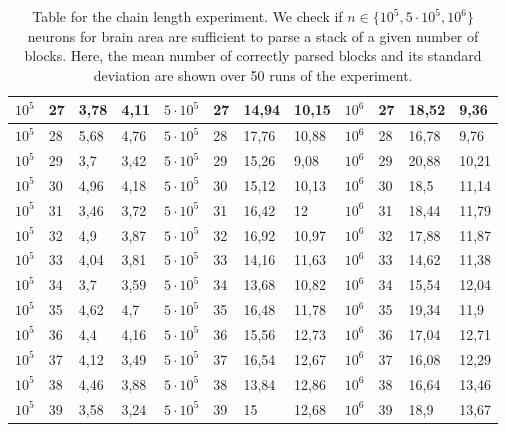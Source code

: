 \documentclass[letterpaper]{article}
\begin{document}
\begin{table}[t]
\begin{tabular}{||l|l|l|l||l|l|l|l||l|l|l|l||}
$10^5$ & 27            & 3,78 & 4,11 & $5 \cdot 10^5$ & 27            & 14,94 & 10,15 & $10^6$ & 27            & 18,52 & 9,36  \\ \hline
$10^5$ & 28            & 5,68 & 4,76 & $5 \cdot 10^5$ & 28            & 17,76 & 10,88 & $10^6$ & 28            & 16,78 & 9,76  \\ \hline
$10^5$ & 29            & 3,7  & 3,42 & $5 \cdot 10^5$ & 29            & 15,26 & 9,08  & $10^6$ & 29            & 20,88 & 10,21 \\ \hline
$10^5$ & 30            & 4,96 & 4,18 & $5 \cdot 10^5$ & 30            & 15,12 & 10,13 & $10^6$ & 30            & 18,5  & 11,14 \\ \hline
$10^5$ & 31            & 3,46 & 3,72 & $5 \cdot 10^5$ & 31            & 16,42 & 12    & $10^6$ & 31            & 18,44 & 11,79 \\ \hline
$10^5$ & 32            & 4,9  & 3,87 & $5 \cdot 10^5$ & 32            & 16,92 & 10,97 & $10^6$ & 32            & 17,88 & 11,87 \\ \hline
$10^5$ & 33            & 4,04 & 3,81 & $5 \cdot 10^5$ & 33            & 14,16 & 11,63 & $10^6$ & 33            & 14,62 & 11,38 \\ \hline
$10^5$ & 34            & 3,7  & 3,59 & $5 \cdot 10^5$ & 34            & 13,68 & 10,82 & $10^6$ & 34            & 15,54 & 12,04 \\ \hline
$10^5$ & 35            & 4,62 & 4,7  & $5 \cdot 10^5$ & 35            & 16,48 & 11,78 & $10^6$ & 35            & 19,34 & 11,9  \\ \hline
$10^5$ & 36            & 4,4  & 4,16 & $5 \cdot 10^5$ & 36            & 15,56 & 12,73 & $10^6$ & 36            & 17,04 & 12,71 \\ \hline
$10^5$ & 37            & 4,12 & 3,49 & $5 \cdot 10^5$ & 37            & 16,54 & 12,67 & $10^6$ & 37            & 16,08 & 12,29 \\ \hline
$10^5$ & 38            & 4,46 & 3,88 & $5 \cdot 10^5$ & 38            & 13,84 & 12,86 & $10^6$ & 38            & 16,64 & 13,46 \\ \hline
$10^5$ & 39            & 3,58 & 3,24 & $5 \cdot 10^5$ & 39            & 15    & 12,68 & $10^6$ & 39            & 18,9  & 13,67 \\ \hline
\end{tabular}
\caption{Table for the chain length experiment. We check if  $n \in \{10^5, 5\cdot 10^5, 10^6\}$ neurons for brain area are sufficient to parse a stack of a given number of blocks. Here, the mean number of correctly parsed blocks and its standard deviation are shown over 50 runs of the experiment.}
\label{table:chain_length_exp}
\end{table}
\end{document}
